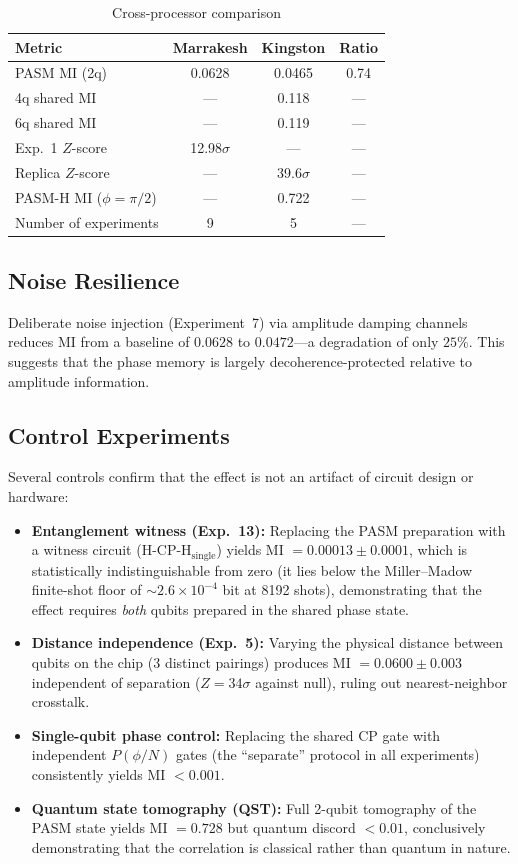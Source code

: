 ﻿\documentclass[12pt,a4paper]{article}
\begin{document}
\begin{table}[ht]
\centering
\caption{Cross-processor comparison}
\label{tab:cross}
\begin{tabular}{lccc}
\toprule
Metric & Marrakesh & Kingston & Ratio \\
\midrule
PASM MI (2q) & 0.0628 & 0.0465 & 0.74 \\
4q shared MI & --- & 0.118 & --- \\
6q shared MI & --- & 0.119 & --- \\
Exp.~1 $Z$-score & 12.98$\sigma$ & --- & --- \\
Replica $Z$-score & --- & 39.6$\sigma$ & --- \\
PASM-H MI ($\phi=\pi/2$) & --- & 0.722 & --- \\
Number of experiments & 9 & 5 & --- \\
\bottomrule
\end{tabular}
\end{table}

\subsection{Noise Resilience}

Deliberate noise injection (Experiment~7) via amplitude damping channels reduces MI from a baseline of $0.0628$ to $0.0472$---a degradation of only $25\%$. This suggests that the phase memory is largely decoherence-protected relative to amplitude information.

\subsection{Control Experiments}

Several controls confirm that the effect is not an artifact of circuit design or hardware:

\begin{itemize}
\item \textbf{Entanglement witness (Exp.~13):} Replacing the PASM preparation with a witness circuit (H-CP-H$_{\text{single}}$) yields MI $= 0.00013 \pm 0.0001$, which is statistically indistinguishable from zero (it lies below the Miller--Madow finite-shot floor of $\sim 2.6\times10^{-4}$ bit at 8192 shots), demonstrating that the effect requires \textit{both} qubits prepared in the shared phase state.
\item \textbf{Distance independence (Exp.~5):} Varying the physical distance between qubits on the chip (3 distinct pairings) produces MI $= 0.0600 \pm 0.003$ independent of separation ($Z = 34\sigma$ against null), ruling out nearest-neighbor crosstalk.
\item \textbf{Single-qubit phase control:} Replacing the shared CP gate with independent $P(\phi/N)$ gates (the ``separate'' protocol in all experiments) consistently yields MI $< 0.001$.
\item \textbf{Quantum state tomography (QST):} Full 2-qubit tomography of the PASM state yields MI $= 0.728$ but quantum discord $< 0.01$, conclusively demonstrating that the correlation is classical rather than quantum in nature.
\end{itemize}
\end{document}
